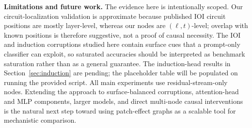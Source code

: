\documentclass[11pt,a4paper]{article}
\begin{document}
\textbf{Limitations and future work.} The evidence here is intentionally scoped. Our circuit-localization validation is approximate because published IOI circuit positions are mostly layer-level, whereas our nodes are $(\ell,t)$-level; overlap with known positions is therefore suggestive, not a proof of causal necessity. The IOI and induction corruptions studied here contain surface cues that a prompt-only classifier can exploit, so saturated accuracies should be interpreted as benchmark saturation rather than as a general guarantee. The induction-head results in Section~\ref{sec:induction} are pending; the placeholder table will be populated on running the provided script. All main experiments use residual-stream-only nodes. Extending the approach to surface-balanced corruptions, attention-head and MLP components, larger models, and direct multi-node causal interventions is the natural next step toward using patch-effect graphs as a scalable tool for mechanistic comparison.



\end{document}
